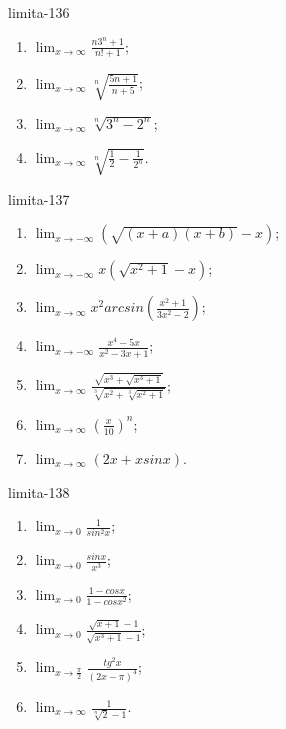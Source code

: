 \begin{defproblem}{limita-136}
\begin{multicols}{2}
\begin{enumerate}
    \item $\lim_{{x \rightarrow \infty}} \frac{n 3^n+1}{n!+1}$;
    \item $\lim_{{x \rightarrow \infty}} \sqrt[n]{\frac{5n+1}{n+5}}$;
    \item $\lim_{{x \rightarrow \infty}} \sqrt[n]{3^n-2^n}$;
    \item $\lim_{{x \rightarrow \infty}} \sqrt[n]{\frac{1}{2}-\frac{1}{2^n}}$.
\end{enumerate}
\end{multicols}
\end{defproblem}

\begin{defproblem}{limita-137}
\begin{multicols}{2}
\begin{enumerate}
    \item $\lim_{{x \rightarrow -\infty}} (\sqrt{(x+a)(x+b)}-x)$;
    \item $\lim_{{x \rightarrow -\infty}} x(\sqrt{x^2+1}-x)$;
    \item $\lim_{{x \rightarrow \infty}} x^2arcsin(\frac{x^2+1}{3x^2-2})$;
    \item $\lim_{{x \rightarrow -\infty}} \frac{x^4-5x}{x^2-3x+1}$;
    \item $\lim_{{x \rightarrow \infty}} \frac{\sqrt{x^3+\sqrt{x^3+1}}}{\sqrt[3]{x^2+\sqrt[3]{x^2+1}}}$;
    \item $\lim_{{x \rightarrow \infty}} (\frac{x}{10})^n$;
    \item $\lim_{{x \rightarrow \infty}} (2x+x sin x)$.
\end{enumerate}
\end{multicols}
\end{defproblem}

\begin{defproblem}{limita-138}
\begin{multicols}{2}
\begin{enumerate}
    \item $\lim_{{x \rightarrow 0}} \frac{1}{sin ^2 x}$;
    \item $\lim_{{x \rightarrow 0}} \frac{sin x}{x^3}$;
    \item $\lim_{{x \rightarrow 0}} \frac{1-cos x}{1-cos x^2}$;
    \item $\lim_{{x \rightarrow 0}} \frac{\sqrt{x+1}-1}{\sqrt{x^3+1}-1}$;
    \item $\lim_{{x \rightarrow \frac{\pi}{2}}} \frac{tg ^2 x}{(2x-\pi)^4}$;
    \item $\lim_{{x \rightarrow \infty}} \frac{1}{\sqrt[n]{2}-1}$.
\end{enumerate}
\end{multicols}
\end{defproblem}

